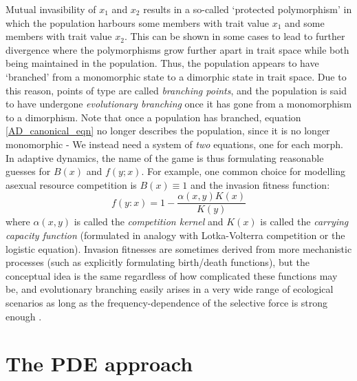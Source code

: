 Mutual invasibility of $x_1$ and $x_2$ results in a so-called `protected polymorphism' in which the population harbours some members with trait value $x_1$ and some members with trait value $x_2$. This can be shown in some cases to lead to further divergence where the polymorphisms grow further apart in trait space while both being maintained in the population. Thus, the population appears to have `branched' from a monomorphic state to a dimorphic state in trait space. Due to this reason, points of type  are called \emph{branching points}, and the population is said to have undergone \emph{evolutionary branching} once it has gone from a monomorphism to a dimorphism. Note that once a population has branched, equation \eqref{AD_canonical_eqn} no longer describes the population, since it is no longer monomorphic - We instead need a system of \emph{two} equations, one for each morph.\\
In adaptive dynamics, the name of the game is thus formulating reasonable guesses for $B(x)$ and $f(y;x)$. For example, one common choice for modelling asexual resource competition is $B(x) \equiv 1$ and the invasion fitness function:
\begin{equation}
	\label{AD_cts_logistic_invasion_fitness}
	f(y:x) = 1 - \frac{\alpha(x,y)K(x)}{K(y)}
\end{equation}
where $\alpha(x,y)$ is called the \emph{competition kernel} and $K(x)$ is called the \emph{carrying capacity function} (formulated in analogy with Lotka-Volterra competition or the logistic equation). Invasion fitnesses are sometimes derived from more mechanistic processes (such as explicitly formulating birth/death functions), but the conceptual idea is the same regardless of how complicated these functions may be, and evolutionary branching easily arises in a very wide range of ecological scenarios as long as the frequency-dependence of the selective force is strong enough \citep{doebeli_evolutionary_2000,doebeli_adaptive_2011}.

\section{The PDE approach}

